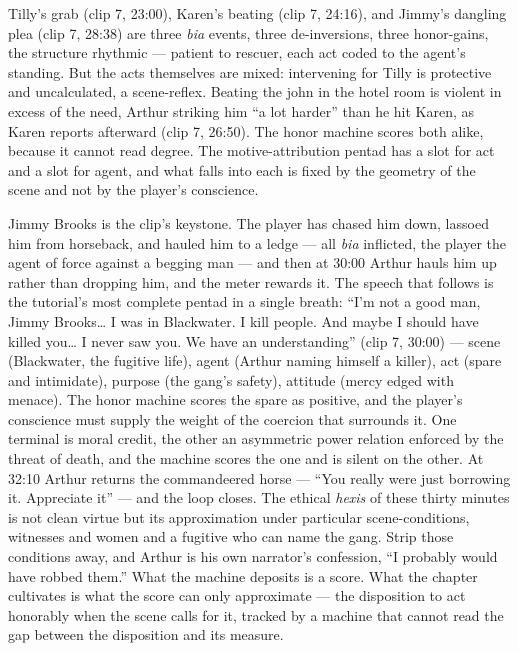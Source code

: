 Tilly's grab (clip 7, 23:00), Karen's beating (clip 7, 24:16), and Jimmy's dangling plea (clip 7, 28:38) are three \textit{bia} events, three de-inversions, three honor-gains, the structure rhythmic — patient to rescuer, each act coded to the agent's standing. But the acts themselves are mixed: intervening for Tilly is protective and uncalculated, a scene-reflex. Beating the john in the hotel room is violent in excess of the need, Arthur striking him ``a lot harder'' than he hit Karen, as Karen reports afterward (clip 7, 26:50). The honor machine scores both alike, because it cannot read degree. The motive-attribution pentad has a slot for act and a slot for agent, and what falls into each is fixed by the geometry of the scene and not by the player's conscience.

Jimmy Brooks is the clip's keystone. The player has chased him down, lassoed him from horseback, and hauled him to a ledge — all \textit{bia} inflicted, the player the agent of force against a begging man — and then at 30:00 Arthur hauls him up rather than dropping him, and the meter rewards it. The speech that follows is the tutorial's most complete pentad in a single breath: ``I'm not a good man, Jimmy Brooks… I was in Blackwater. I kill people. And maybe I should have killed you… I never saw you. We have an understanding'' (clip 7, 30:00) — scene (Blackwater, the fugitive life), agent (Arthur naming himself a killer), act (spare and intimidate), purpose (the gang's safety), attitude (mercy edged with menace). The honor machine scores the spare as positive, and the player's conscience must supply the weight of the coercion that surrounds it. One terminal is moral credit, the other an asymmetric power relation enforced by the threat of death, and the machine scores the one and is silent on the other. At 32:10 Arthur returns the commandeered horse — ``You really were just borrowing it. Appreciate it'' — and the loop closes. The ethical \textit{hexis} of these thirty minutes is not clean virtue but its approximation under particular scene-conditions, witnesses and women and a fugitive who can name the gang. Strip those conditions away, and Arthur is his own narrator's confession, ``I probably would have robbed them.'' What the machine deposits is a score. What the chapter cultivates is what the score can only approximate — the disposition to act honorably when the scene calls for it, tracked by a machine that cannot read the gap between the disposition and its measure.

\bigskip

